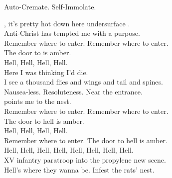 Auto-Cremate. Self-Immolate. \\




, it's pretty hot down here undersurface .\\
Anti-Christ has tempted me with a purpose. \\

Remember where to enter. Remember where to enter. \\
The door to  is amber. \\

Hell, Hell, Hell, Hell. \\

Here I was thinking I'd die. \\
I see a thousand flies and wings and tail and spines. \\
Nausea-less. Resoluteness. Near the entrance. \\
 points me to the  nest. \\

Remember where to enter. Remember where to enter. \\
The door to hell is amber. \\

Hell, Hell, Hell, Hell. \\

Remember where to enter. The door to hell is amber. \\

Hell, Hell, Hell, Hell, Hell, Hell, Hell, Hell. \\

XV infantry paratroop into the propylene new scene. \\
Hell's where they wanna be. Infest the rats' nest. \\
